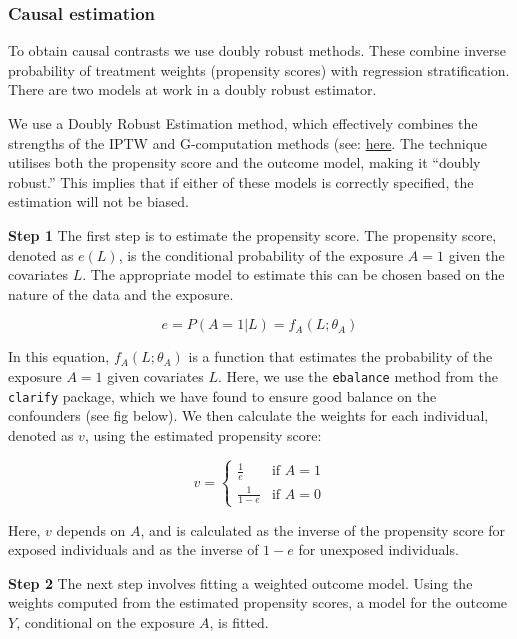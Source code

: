 \documentclass[
  singlecolumn,
  9pt]{article}
\begin{document}
\subsubsection{Causal estimation}\label{causal-estimation}

To obtain causal contrasts we use doubly robust methods. These combine
inverse probability of treatment weights (propensity scores) with
regression stratification. There are two models at work in a doubly
robust estimator.

We use a Doubly Robust Estimation method, which effectively combines the
strengths of the IPTW and G-computation methods (see:
\href{https://go-bayes.github.io/psych-434-2023/content/09-content.html\#comprehensive-checklist-for-detailed-reporting-of-a-causal-inferenctial-study-e.g.-assessment-3-option-2}{here}.
The technique utilises both the propensity score and the outcome model,
making it ``doubly robust.'' This implies that if either of these models
is correctly specified, the estimation will not be biased.

\textbf{Step 1} The first step is to estimate the propensity score. The
propensity score, denoted as \(e(L)\), is the conditional probability of
the exposure \(A = 1\) given the covariates \(L\). The appropriate model
to estimate this can be chosen based on the nature of the data and the
exposure.

\[e = P(A = 1 | L) = f_A(L; \theta_A)\]

In this equation, \(f_A(L; \theta_A)\) is a function that estimates the
probability of the exposure \(A = 1\) given covariates \(L\). Here, we
use the \texttt{ebalance} method from the \texttt{clarify} package,
which we have found to ensure good balance on the confounders (see fig
below). We then calculate the weights for each individual, denoted as
\(v\), using the estimated propensity score:

\[
v = 
\begin{cases} 
\frac{1}{e} & \text{if } A = 1 \\
\frac{1}{1-e} & \text{if } A = 0 
\end{cases}
\]

Here, \(v\) depends on \(A\), and is calculated as the inverse of the
propensity score for exposed individuals and as the inverse of \(1-e\)
for unexposed individuals.

\textbf{Step 2} The next step involves fitting a weighted outcome model.
Using the weights computed from the estimated propensity scores, a model
for the outcome \(Y\), conditional on the exposure \(A\), is fitted.
\end{document}
